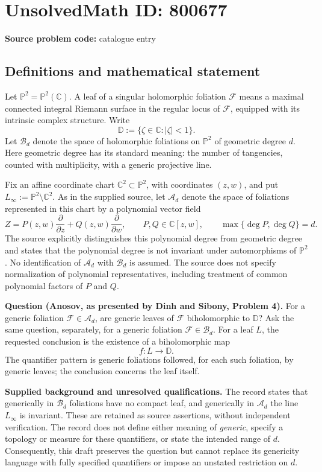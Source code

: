 \documentclass[11pt]{article}
\newcommand{\C}{\mathbb{C}}
\begin{document}
\section*{UnsolvedMath ID: 800677}
\textbf{Source problem code:} catalogue entry
\subsection{Definitions and mathematical statement}
Let \(\mathbb P^2=\mathbb P^2(\C)\). A leaf of a singular holomorphic foliation \(\mathcal F\) means a maximal connected integral Riemann surface in the regular locus of \(\mathcal F\), equipped with its intrinsic complex structure. Write
\[
\mathbb D:=\{\zeta\in\C:|\zeta|<1\}.
\]
Let \(\mathscr B_d\) denote the space of holomorphic foliations on \(\mathbb P^2\) of geometric degree \(d\). Here geometric degree has its standard meaning: the number of tangencies, counted with multiplicity, with a generic projective line.

Fix an affine coordinate chart \(\C^2\subset\mathbb P^2\), with coordinates \((z,w)\), and put \(L_\infty:=\mathbb P^2\setminus\C^2\). As in the supplied source, let \(\mathscr A_d\) denote the space of foliations represented in this chart by a polynomial vector field
\[
Z=P(z,w)\frac{\partial}{\partial z}
  +Q(z,w)\frac{\partial}{\partial w},
\qquad P,Q\in\C[z,w],\qquad
\max\{\deg P,\deg Q\}=d.
\]
The source explicitly distinguishes this polynomial degree from geometric degree and states that the polynomial degree is not invariant under automorphisms of \(\mathbb P^2\). No identification of \(\mathscr A_d\) with \(\mathscr B_d\) is assumed. The source does not specify normalization of polynomial representatives, including treatment of common polynomial factors of \(P\) and \(Q\).

\textbf{Question (Anosov, as presented by Dinh and Sibony, Problem 4).} For a generic foliation \(\mathcal F\in\mathscr A_d\), are generic leaves of \(\mathcal F\) biholomorphic to \(\mathbb D\)? Ask the same question, separately, for a generic foliation \(\mathcal F\in\mathscr B_d\). For a leaf \(L\), the requested conclusion is the existence of a biholomorphic map
\[
f:L\longrightarrow\mathbb D.
\]
The quantifier pattern is generic foliations followed, for each such foliation, by generic leaves; the conclusion concerns the leaf itself.

\textbf{Supplied background and unresolved qualifications.} The record states that generically in \(\mathscr B_d\) foliations have no compact leaf, and generically in \(\mathscr A_d\) the line \(L_\infty\) is invariant. These are retained as source assertions, without independent verification. The record does not define either meaning of \emph{generic}, specify a topology or measure for these quantifiers, or state the intended range of \(d\). Consequently, this draft preserves the question but cannot replace its genericity language with fully specified quantifiers or impose an unstated restriction on \(d\).
\end{document}
